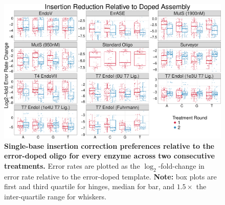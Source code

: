 \documentclass[letterpaper,12pt]{article}
\begin{document}
\clearpage
\begin{figure}[t]
\centering
\includegraphics[width=174mm]{Enzyme_Prefs_Insertions-1.pdf}
\caption{\small \textbf{Single-base insertion correction preferences relative to the error-doped oligo for every enzyme across two consecutive treatments.} Error rates are plotted as the $\log_2$-fold-change in error rate relative to the error-doped template. \textbf{Note:} box plots are first and third quartile for hinges, median for bar, and $1.5\times$ the inter-quartile range for whiskers.}
\end{figure}
\end{document}
